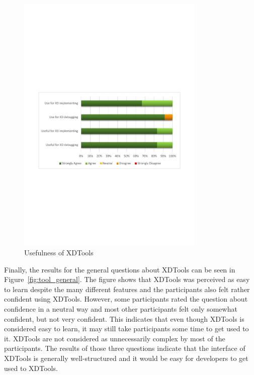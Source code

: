 \begin{figure}[H]
  \centering
    \includegraphics[width=0.8\textwidth]{images/charts/usefulness_tool.pdf}
	\caption[Usefulness]{Usefulness of XDTools}
	\label{fig:usefulness_tool}
\end{figure}

Finally, the results for the general questions about XDTools can be seen in Figure~\ref{fig:tool_general}. The figure shows that XDTools was perceived as easy to learn despite the many different features and the participants also felt rather confident using XDTools. However, some participants rated the question about confidence in a neutral way and most other participants felt only somewhat confident, but not very confident. This indicates that even though XDTools is considered easy to learn, it may still take participants some time to get used to it. XDTools are not considered as unnecessarily complex by most of the participants. The results of those three questions indicate that the interface of XDTools is generally well-structured and it would be easy for developers to get used to XDTools.

